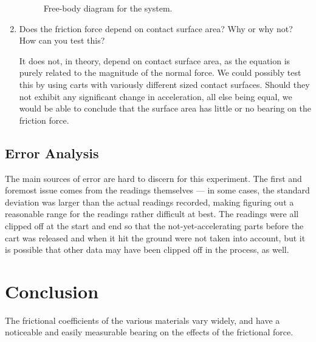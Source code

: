 \begin{enumerate}
\begin{figure}[h]
\caption{Free-body diagram for the system.}

\end{figure}

\item Does the friction force depend on contact surface area? Why or why not? How can you test this?

It does not, in theory, depend on contact surface area, as the equation is purely related to the magnitude of the normal force.
We could possibly test this by using carts with variously different sized contact surfaces.
Should they not exhibit any significant change in acceleration, all else being equal, we would be able to conclude that the surface area has little or no bearing on the friction force.

\end{enumerate}

\subsection{Error Analysis}

The main sources of error are hard to discern for this experiment.
The first and foremost issue comes from the readings themselves --- in some cases, the standard deviation was larger than the actual readings recorded, making figuring out a reasonable range for the readings
rather difficult at best.
The readings were all clipped off at the start and end so that the not-yet-accelerating parts before the cart was released and when it hit the ground were not taken into account,
but it is possible that other data may have been clipped off in the process, as well.

\section{Conclusion}

The frictional coefficients of the various materials vary widely, and have a noticeable and easily measurable bearing on the effects of the frictional force.

